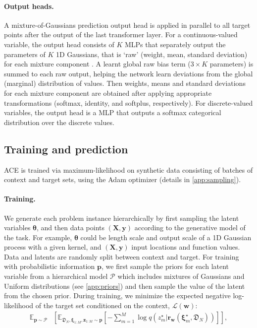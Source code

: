 \documentclass[twoside]{article}
\renewcommand{\r}{\mathbf{r}}
\newcommand{\vtheta}{{\bm{\theta}}}
\newcommand{\vxi}{\bm{\xi}}
\newcommand{\y}{\mathbf{y}}
\newcommand{\z}{\mathbf{z}}
\newcommand{\X}{\mathbf{X}}
\newcommand{\dataplus}{\mathfrak{D}} %
\begin{document}
\paragraph{Output heads.} 
A mixture-of-Gaussians prediction output head is applied in parallel to all target points after the output of the last transformer layer. For a continuous-valued variable, the output head consists of $K$ MLPs that separately output the parameters of $K$ 1D Gaussians, that is `raw' (weight, mean, standard deviation) for each mixture component \citep{uria2016neural}. A learnt global raw bias term ($3 \times K$ parameters) is summed to each raw output, %
helping the network learn deviations from the global (marginal) distribution of values. Then weights, means and standard deviations for each mixture component are obtained after applying appropriate transformations (softmax, identity, and softplus, respectively). For discrete-valued variables, the output head is a MLP that outputs a softmax categorical distribution over the discrete values.


\subsection{Training and prediction}
\label{sec:training}

ACE is trained via maximum-likelihood on synthetic data consisting of batches of context and target sets, using the Adam optimizer (details in \cref{app:sampling}).


\vspace{-0.25em}
\paragraph{Training.}
We generate each problem instance hierarchically by first sampling the latent variables $\vtheta$, and then data points $(\X, \y)$ according to the generative model of the task. For example, $\vtheta$ could be length scale and output scale of a 1D Gaussian process with a given kernel, and $(\X, \y)$ input locations and function values. Data and latents are randomly split between context and target. For training with probabilistic information $\mathbf{p}$, we first sample the priors for each latent variable from a hierarchical model $\mathcal{P}$ which includes mixtures of Gaussians and Uniform distributions (see \cref{app:priors}) and then sample the value of the latent from the chosen prior. During training, we minimize the expected negative log-likelihood of the target set conditioned on the context, $\mathcal{L}\left(\textbf{w}\right)$:
\begin{equation} 
\label{eq:loss}
\begin{split}
\mathbb{E}_\mathcal{\mathbf{p} \sim P} &\left[ \mathbb{E}_{\dataplus_N, \vxi_{1:M},\z_{1:M} \sim \mathbf{p}}\left[-\sum_{m=1}^M \log q\left(z^\star_m|\r_\textbf{w}(\vxi^\star_m, \dataplus_N)\right) \right] \right],
\end{split}
\end{equation}
\vspace{-1.75em}
\end{document}
